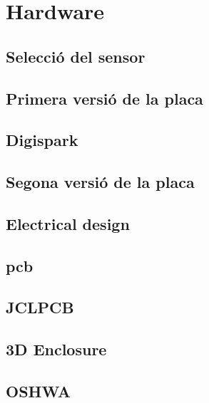 \chapter{Hardware}
\section{Selecció del sensor}
\section{Primera versió de la placa}
\section{Digispark}
\section{Segona versió de la placa}
\section{Electrical design}
\section{pcb}
\section{JCLPCB}
\section{3D Enclosure}
\section{OSHWA}
